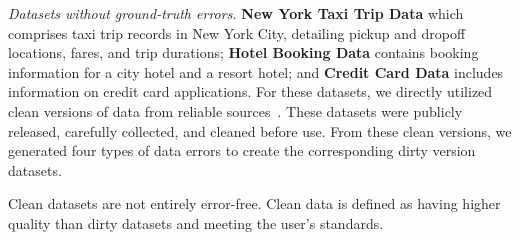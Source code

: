\noindent \textit{Datasets without ground-truth errors.} 
\textbf{New York Taxi Trip Data\cite{nyc_taxi}} which comprises taxi trip records in New York City, detailing pickup and dropoff locations, fares, and trip durations;
\textbf{Hotel Booking Data\cite{antonio2019hotel}} contains booking information for a city hotel and a resort hotel; and
\textbf{Credit Card Data\cite{credit_card}} includes information on credit card applications.
For these datasets, we directly utilized clean versions of data from reliable sources~\cite{credit_card,antonio2019hotel,nyc_taxi}. These datasets were publicly released, carefully collected, and cleaned before use. From these clean versions, we generated four types of data errors to create the corresponding dirty version datasets.

Clean datasets are not entirely error-free. Clean data is defined as having higher quality than dirty datasets and meeting the user's standards.






